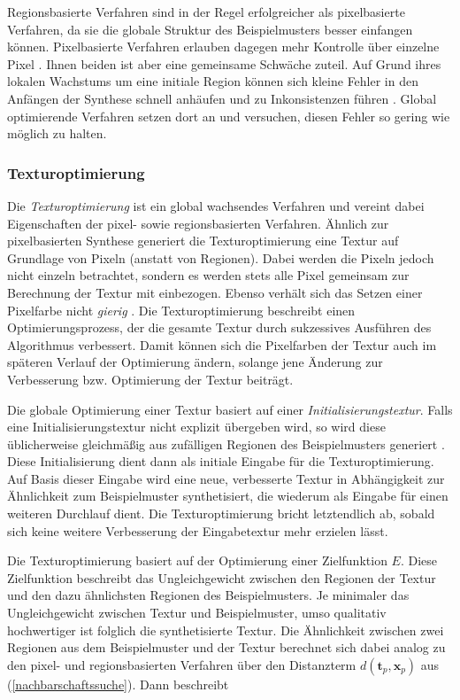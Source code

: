 Regionsbasierte Verfahren sind in der Regel erfolgreicher als pixelbasierte Verfahren, da sie die globale Struktur des Beispielmusters besser einfangen können.
Pixelbasierte Verfahren erlauben dagegen mehr Kontrolle über einzelne Pixel \cite{TextureOptimization}.
Ihnen beiden ist aber eine gemeinsame Schwäche zuteil.
Auf Grund ihres lokalen Wachstums um eine initiale Region können sich kleine Fehler in den Anfängen der Synthese schnell anhäufen und zu Inkonsistenzen führen \cite{TextureOptimization}.
Global optimierende Verfahren setzen dort an und versuchen, diesen Fehler so gering wie möglich zu halten.

\subsubsection{Texturoptimierung}

Die \emph{Texturoptimierung} ist ein global wachsendes Verfahren und vereint dabei Eigenschaften der pixel- sowie regionsbasierten Verfahren.
Ähnlich zur pixelbasierten Synthese generiert die Texturoptimierung eine Textur auf Grundlage von Pixeln (anstatt von Regionen).
Dabei werden die Pixeln jedoch nicht einzeln betrachtet, sondern es werden stets alle Pixel gemeinsam zur Berechnung der Textur mit einbezogen.
Ebenso verhält sich das Setzen einer Pixelfarbe nicht \emph{gierig} \cite{StateOfTheArt}.
Die Texturoptimierung beschreibt einen Optimierungsprozess, der die gesamte Textur durch sukzessives Ausführen des Algorithmus verbessert.
Damit können sich die Pixelfarben der Textur auch im späteren Verlauf der Optimierung ändern, solange jene Änderung zur Verbesserung bzw. Optimierung der Textur beiträgt.

Die globale Optimierung einer Textur basiert auf einer \emph{Initialisierungstextur}.
Falls eine Initialisierungstextur nicht explizit übergeben wird, so wird diese üb\-lich\-er\-wei\-se gleichmäßig aus zufälligen Regionen des Beispielmusters generiert \cite{TextureOptimization}.
Diese Initialisierung dient dann als initiale Eingabe für die Texturoptimierung.
Auf Basis dieser Eingabe wird eine neue, verbesserte Textur in Abhängigkeit zur Ähnlichkeit zum Beispielmuster synthetisiert, die wiederum als Eingabe für einen weiteren Durchlauf dient.
Die Texturoptimierung bricht letztendlich ab, sobald sich keine weitere Verbesserung der Eingabetextur mehr erzielen lässt.

Die Texturoptimierung basiert auf der Optimierung einer Zielfunktion $E$.
Diese Zielfunktion beschreibt das Ungleichgewicht zwischen den Regionen der Textur und den dazu ähnlichsten Regionen des Beispielmusters.
Je minimaler das Ungleichgewicht zwischen Textur und Beispielmuster, umso qualitativ hochwertiger ist folglich die synthetisierte Textur.
Die Ähnlichkeit zwischen zwei Regionen aus dem Beispielmuster und der Textur berechnet sich dabei analog zu den pixel- und regionsbasierten Verfahren über den Distanzterm $d(\textbf{t}_p, \textbf{x}_p)$ aus (\ref{nachbarschaftssuche}).
Dann beschreibt

